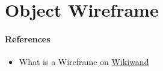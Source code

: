
\section{Object Wireframe}

\paragraph{References}
\begin{itemize}
    \item What is a Wireframe on \href{https://www.wikiwand.com/en/Wire-frame_model}{Wikiwand}
\end{itemize}
